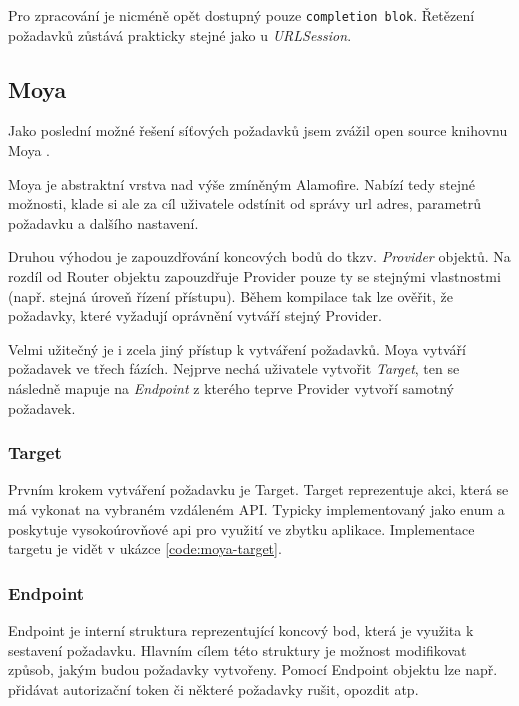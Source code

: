 Pro zpracování je nicméně opět dostupný pouze \texttt{completion blok}.
Řetězení požadavků zůstává prakticky stejné jako u \textit{URLSession}.

\subsection{Moya}

Jako poslední možné řešení síťových požadavků jsem zvážil open source knihovnu Moya \cite{github-moya}.

Moya je abstraktní vrstva nad výše zmíněným Alamofire.
Nabízí tedy stejné možnosti, klade si ale za cíl uživatele odstínit od správy \acrshort{url} adres, parametrů požadavku a dalšího nastavení.

Druhou výhodou je zapouzdřování koncových bodů do tkzv. \textit{Provider} objektů.
Na rozdíl od Router objektu zapouzdřuje Provider pouze ty se stejnými vlastnostmi (např. stejná úroveň řízení přístupu).
Během kompilace tak lze ověřit, že požadavky, které vyžadují oprávnění vytváří stejný Provider.

\medskip

Velmi užitečný je i zcela jiný přístup k vytváření požadavků.
Moya vytváří požadavek ve třech fázích.
Nejprve nechá uživatele vytvořit \textit{Target}, ten se následně mapuje na \textit{Endpoint} z kterého teprve Provider vytvoří samotný požadavek.

\subsubsection*{Target}

Prvním krokem vytváření požadavku je Target.
Target reprezentuje akci, která se má vykonat na vybraném vzdáleném API.
Typicky implementovaný jako enum a poskytuje vysokoúrovňové \acrshort{api} pro využití ve zbytku aplikace.
Implementace targetu je vidět v ukázce \ref{code:moya-target}.


\subsubsection*{Endpoint}

Endpoint je interní struktura reprezentující koncový bod, která je využita k sestavení požadavku.
Hlavním cílem této struktury je možnost modifikovat způsob, jakým budou požadavky vytvořeny.
Pomocí Endpoint objektu lze např. přidávat autorizační token či některé požadavky rušit, opozdit atp.


